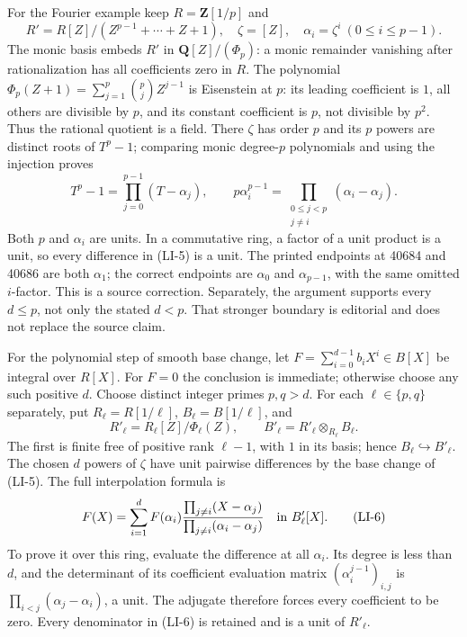 For the Fourier example keep \(R=\mathbf Z[1/p]\) and \[
R'=R[Z]/(Z^{p-1}+\cdots+Z+1),\quad \zeta=[Z],\quad
\alpha_i=\zeta^i\ (0\leq i\leq p-1).
\] The monic basis embeds \(R'\) in \(\mathbf Q[Z]/(\Phi_p)\): a monic remainder vanishing after rationalization has all coefficients zero in \(R\). The polynomial \(\Phi_p(Z+1)=\sum_{j=1}^p\binom pj Z^{j-1}\) is Eisenstein at \(p\): its leading coefficient is \(1\), all others are divisible by \(p\), and its constant coefficient is \(p\), not divisible by \(p^2\). Thus the rational quotient is a field. There \(\zeta\) has order \(p\) and its \(p\) powers are distinct roots of \(T^p-1\); comparing monic degree-\(p\) polynomials and using the injection proves \[
T^p-1=\prod_{j=0}^{p-1}(T-\alpha_j),\qquad
p\alpha_i^{p-1}=\prod_{\substack{0\leq j<p\\j\ne i}}
(\alpha_i-\alpha_j).
\tag{LI-5}
\] Both \(p\) and \(\alpha_i\) are units. In a commutative ring, a factor of a unit product is a unit, so every difference in (LI-5) is a unit. The printed endpoints at 40684 and 40686 are both \(\alpha_1\); the correct endpoints are \(\alpha_0\) and \(\alpha_{p-1}\), with the same omitted \(i\)-factor. This is a source correction. Separately, the argument supports every \(d\leq p\), not only the stated \(d<p\). That stronger boundary is editorial and does not replace the source claim.

For the polynomial step of smooth base change, let \(F=\sum_{i=0}^{d-1}b_iX^i\in B[X]\) be integral over \(R[X]\). For \(F=0\) the conclusion is immediate; otherwise choose any such positive \(d\). Choose distinct integer primes \(p,q>d\). For each \(\ell\in\{p,q\}\) separately, put \(R_\ell=R[1/\ell]\), \(B_\ell=B[1/\ell]\), and \[
R'_\ell=R_\ell[Z]/\Phi_\ell(Z),\qquad
B'_\ell=R'_\ell\otimes_{R_\ell}B_\ell.
\] The first is finite free of positive rank \(\ell-1\), with \(1\) in its basis; hence \(B_\ell\hookrightarrow B'_\ell\). The chosen \(d\) powers of \(\zeta\) have unit pairwise differences by the base change of (LI-5). The full interpolation formula is \[
F(X)=\sum_{i=1}^d F(\alpha_i)
\frac{\prod_{j\ne i}(X-\alpha_j)}
{\prod_{j\ne i}(\alpha_i-\alpha_j)}
\quad\hbox{in }B'_\ell[X].
\tag{LI-6}
\] To prove it over this ring, evaluate the difference at all \(\alpha_i\). Its degree is less than \(d\), and the determinant of its coefficient evaluation matrix \((\alpha_i^{j-1})_{i,j}\) is \(\prod_{i<j}(\alpha_j-\alpha_i)\), a unit. The adjugate therefore forces every coefficient to be zero. Every denominator in (LI-6) is retained and is a unit of \(R'_\ell\).

